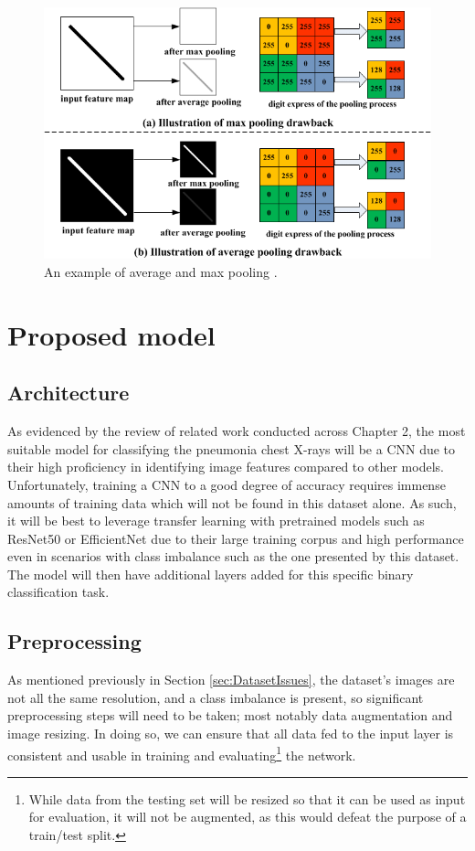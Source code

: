 \documentclass[12pt]{report}
\newcommand{\para}{\vspace{7pt}\noindent}
\begin{document}
\begin{figure}[H]
    \centering
    \includegraphics[width=\textwidth]{Proposal/PoolingLayers.png}
    \caption{An example of average and max pooling \autocite{yuMixedPoolingConvolutional2014}.\label{fig:Pooling}}
\end{figure}


\chapter{Proposed model}
\section{Architecture}\label{sec:ModelArchitecture}
As evidenced by the review of related work conducted across Chapter 2, the most suitable model for
classifying the pneumonia chest X-rays will be a CNN due to their high proficiency in identifying image 
features compared to other models. Unfortunately, training a CNN to a good degree of accuracy requires 
immense amounts of training data which will not be found in this dataset alone. As such, it will be 
best to leverage transfer learning with pretrained models such as ResNet50 or EfficientNet due to their large training 
corpus and high performance even in scenarios with class imbalance such as the one presented by this 
dataset. The model will then have additional layers added for this specific binary classification task.

\section{Preprocessing}
\para As mentioned previously in Section \ref{sec:DatasetIssues}, the dataset's images are not
all the same resolution, and a class imbalance is present, so significant preprocessing steps will need 
to be taken; most notably data augmentation and image resizing. In doing so, we can ensure that all 
data fed to the input layer is consistent and usable in training and evaluating\footnote{While data from the testing set will be resized so that it can be used as input for evaluation, it will not be augmented, as this would defeat the purpose of a train/test split.} 
the network.
\end{document}
